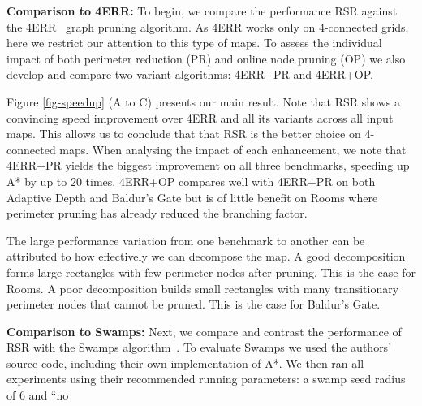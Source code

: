 \par
\textbf{Comparison to 4ERR: }
To begin, we compare the performance RSR against the 4ERR~\cite{harabor10} graph
pruning algorithm.  As 4ERR works only on
4-connected grids, here we restrict our attention to this type of maps.  To
assess the individual impact of both perimeter reduction (PR) and online node
pruning (OP) we also develop and compare two variant algorithms: 4ERR+PR and
4ERR+OP. 
\par
Figure \ref{fig-speedup} (A to C) presents our main result.
Note that RSR shows a convincing 
speed improvement over 4ERR and all its variants across all input maps.
This allows us to conclude that that RSR is the better choice on 4-connected maps.
When analysing the impact of each enhancement, we note that 4ERR+PR yields the
biggest improvement on all three benchmarks, speeding up A* by up to 20 times.
4ERR+OP compares well with 4ERR+PR on both Adaptive Depth and
Baldur's Gate but is of little benefit on Rooms where perimeter pruning has
already reduced the branching factor.
\par
The large performance variation from one benchmark to another can be attributed
to how effectively we can decompose the map. A good decomposition forms large
rectangles with few perimeter nodes after pruning. This is the case for Rooms.
A poor decomposition builds small rectangles with many transitionary perimeter 
nodes that cannot be pruned. This is the case for Baldur's Gate. 
\par
\textbf{Comparison to Swamps:}
Next, we compare and contrast the performance of RSR with the Swamps
algorithm~\cite{pochter10}.  To evaluate Swamps we used the authors' source
code, including their own implementation of A*.  We then ran all experiments
using their recommended running parameters: a swamp seed radius of 6 and ``no
